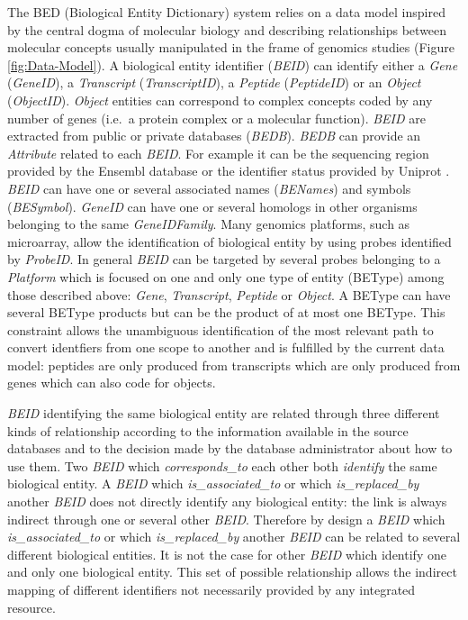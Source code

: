 \documentclass[9pt,a4paper,]{extarticle}
\theoremstyle{definition}
\theoremstyle{definition}
\theoremstyle{definition}
\theoremstyle{remark}
\begin{document}
The BED (Biological Entity Dictionary) system relies on a data model
inspired by the central dogma of
molecular biology \citep{crick_central_1970} and describing
relationships between molecular concepts
usually manipulated in the frame of genomics studies
(Figure \ref{fig:Data-Model}).
A biological entity identifier (\emph{BEID}) can identify either a \emph{Gene} (\emph{GeneID}),
a \emph{Transcript} (\emph{TranscriptID}), a \emph{Peptide} (\emph{PeptideID}) or
an \emph{Object} (\emph{ObjectID}). \emph{Object} entities can correspond to complex concepts
coded by any number of genes (i.e.~a protein complex or a molecular function).
\emph{BEID} are extracted from public or private databases (\emph{BEDB}).
\emph{BEDB} can provide an \emph{Attribute} related to each \emph{BEID}.
For example it can be the
sequencing region provided by the Ensembl database \citep{zerbino_ensembl_2017}
or the identifier
status provided by Uniprot \citep{the_uniprot_consortium_uniprot:_2017}.
\emph{BEID} can have one or several associated names (\emph{BENames}) and symbols
(\emph{BESymbol}). \emph{GeneID} can have one or several homologs in other organisms
belonging to the same \emph{GeneIDFamily}.
Many genomics platforms, such as microarray, allow the identification of
biological entity by using probes identified by \emph{ProbeID}. In general
\emph{BEID} can be targeted by several probes belonging to a \emph{Platform} which
is focused on one and only one type of entity (BEType) among those described
above: \emph{Gene}, \emph{Transcript}, \emph{Peptide} or \emph{Object}. A BEType can have several
BEType products but can be the product of at most one BEType.
This constraint allows the unambiguous identification of the most relevant path
to convert identfiers from one scope to another and
is fulfilled by the current data model:
peptides are only produced from transcripts which are only produced
from genes which can also code for objects.

\emph{BEID} identifying the same biological entity are related through three
different kinds of relationship according to the information available
in the source databases and to the decision made by the database administrator
about how to use them. Two \emph{BEID} which \emph{corresponds\_to} each other both
\emph{identify} the same biological entity. A \emph{BEID} which \emph{is\_associated\_to} or
which \emph{is\_replaced\_by} another \emph{BEID} does not directly
identify any biological entity: the link is always indirect through
one or several other \emph{BEID}. Therefore by design a \emph{BEID}
which \emph{is\_associated\_to} or which \emph{is\_replaced\_by} another \emph{BEID} can be
related to several different biological entities. It is not the case for
other \emph{BEID} which identify one and only one biological entity.
This set of possible relationship allows the indirect mapping of
different identifiers not necessarily provided by any integrated resource.
\end{document}
